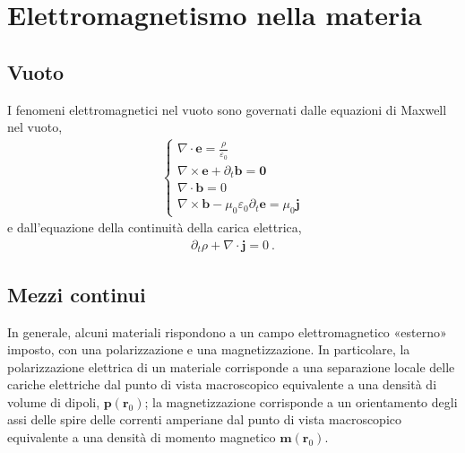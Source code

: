 \documentclass[letterpaper,10pt,italian]{jupyterBook}
\begin{document}
\chapter{Elettromagnetismo nella materia}
\label{\detokenize{ch/media:elettromagnetismo-nella-materia}}\label{\detokenize{ch/media:classical-electromagnetism-media}}\label{\detokenize{ch/media::doc}}
\sphinxAtStartPar
{}


\section{Vuoto}
\label{\detokenize{ch/media:vuoto}}
\sphinxAtStartPar
I fenomeni elettromagnetici nel vuoto sono governati dalle equazioni di Maxwell nel vuoto,
\begin{equation*}
\begin{split}\begin{cases}
\nabla \cdot \mathbf{e} = \frac{\rho}{\varepsilon_0} \\
\nabla \times \mathbf{e} + \partial_t \mathbf{b} = \mathbf{0} \\
\nabla \cdot \mathbf{b} = 0 \\
\nabla \times \mathbf{b} - \mu_0 \varepsilon_0 \partial_t \mathbf{e} = \mu_0 \mathbf{j}
\end{cases}\end{split}
\end{equation*}
\sphinxAtStartPar
e dall’equazione della continuità della carica elettrica,
\begin{equation*}
\begin{split}\partial_t \rho + \nabla \cdot \mathbf{j} = 0 \ .\end{split}
\end{equation*}

\section{Mezzi continui}
\label{\detokenize{ch/media:mezzi-continui}}
\sphinxAtStartPar
In generale, alcuni materiali rispondono a un campo elettromagnetico «esterno» imposto, con una polarizzazione e una magnetizzazione. In particolare, la polarizzazione elettrica di un materiale corrisponde a una separazione locale delle cariche elettriche dal punto di vista macroscopico equivalente a una densità di volume di dipoli, \(\mathbf{p}(\mathbf{r}_0)\); la magnetizzazione corrisponde a un orientamento degli assi delle spire delle correnti amperiane dal punto di vista macroscopico equivalente a una densità di momento magnetico \(\mathbf{m}(\mathbf{r}_0)\).
\end{document}
